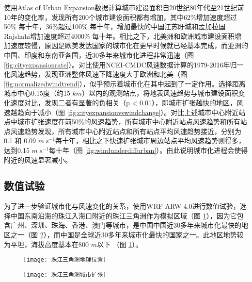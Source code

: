 使用Atlas of Urban Expansion数据计算城市建设面积自20世纪80年代至21世纪前10年的变化率，发现所有200个城市建设面积都有增加，其中62\%增加速度超过50\% 每十年，36\%超过100\% 每十年，增加最快的中国江苏盱城和孟加拉国Rajshahi增加速度超过4000\% 每十年。相比之下，北美洲和欧洲城市建设面积增加速度较慢，原因是欧美发达国家的城市化在更早时候就已经基本完成，而亚洲的中国、印度和东南亚各国，近30多年来城市化进程非常迅速（图 \ref{fig:cityexpansionrate}）。对比使用NCEI-CMDC风速数据计算的1979-2016年归一化风速趋势，发现亚洲整体风速下降速度大于欧洲和北美（图 \ref{fig:normalizedwindtrend}），似乎预示着城市化在其中起到了一定作用。选择距离城市中心0.15度（约15 $km$）以内的观测站点，将地表风速趋势与城市建设面积变化速度对比，发现二者有显著的负相关（p < 0.01），即城市扩张越快的地区，风速越趋向于减小（图 \ref{fig:cityexpansionvswindchange}）。对比上述城市中心附近站点中城市扩张速度在前50\%的风速趋势，所有城市中心附近站点风速趋势和所有站点风速趋势发现，所有城市中心附近站点和所有站点平均风速趋势接近，分别为0.1 和 0.09 $m ~ s^{-1}$每十年，相比之下快速扩张城市周边站点平均风速趋势则得多，达到0.15 $m ~ s^{-1}$每十年（图 \ref{fig:windunderdiffurban}）。由此说明城市化进程会使得附近的风速显著减小。

\subsection{数值试验}

为了进一步验证城市化与风速变化的关系，使用WRF-ARW 4.0进行数值试验，选择中国东南沿海的珠江入海口附近的珠江三角洲作为模拟区域（图 \ref{fig:PRDlocation}），因为它包含广州、深圳、珠海、香港、澳门等城市，是中国中国近30多年来城市化最快的地区之一（图 \ref{fig:PRDcityexpand}），而中国是全球近30多年来城市化最快的国家之一。此地区地势较为平坦，海拔高度基本在800 $m$以下 （图 \ref{fig:PRDlocation}）。

\begin{figure}[!htbp]
    \centering
    \texttt{[image: 珠江三角洲地理位置]}
    \label{fig:PRDlocation}
\end{figure}

\begin{figure}[!t]
    \centering
    \texttt{[image: 珠江三角洲城市扩张]}
    \label{fig:PRDcityexpand}
\end{figure}

